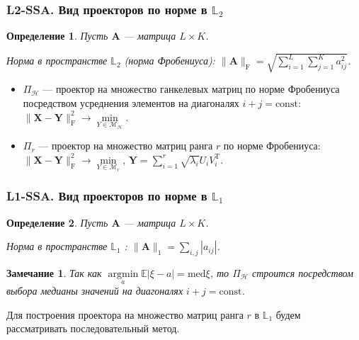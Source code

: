 \documentclass[10pt, ucs, notheorems, handout]{beamer}
\DeclareMathOperator*{\argminB}{argmin}   %
\newtheorem{def1}{Определение}
\newtheorem{notice}{Замечание}
\begin{document}
\begin{frame}
\frametitle{L2-SSA. Вид проекторов по норме в $\mathbb{L}_2$}
\begin{def1} 
Пусть $\mathbf{A}$ --- матрица $L\times K$.

Норма в пространстве $\mathbb{L}_2$ (норма Фробениуса):  $\|\mathbf{A}\|_\mathrm{F} = \sqrt{\sum\limits_{i=1}^{L} {\sum\limits_{j=1}^{K} a_{ij}^2}}$.			
\end{def1}
\begin{itemize}
\item
$\Pi_{\mathcal{H}}$ --- проектор на множество ганкелевых матриц по норме Фробениуса посредством усреднения элементов на диагоналях $i+j=\text{const}$:
$\|\mathbf{X}-\mathbf{Y}\|_\mathrm{F}^2 \longrightarrow \min\limits_{Y \in \mathcal{M}_{\mathcal{H}} } $.\\
\item
$\Pi_{r}$ --- проектор на множество матриц ранга $r$ по норме Фробениуса:  $\|\mathbf{X}-\mathbf{Y}\|_\mathrm{F}^2 \longrightarrow \min\limits_{Y \in \mathcal{M}_{r} } $, $\mathbf{Y}=\sum \limits_{i=1}^{r}{\sqrt{\lambda_i}U_iV_i^\mathrm{T}}$.
\end{itemize}
\end{frame}

\begin{frame}
\frametitle{L1-SSA. Вид проекторов по норме в $\mathbb{L}_1$}
\begin{def1} 
Пусть $\mathbf{A}$ --- матрица $L\times K$.

Норма в пространстве $\mathbb{L}_1$ :  $\|\mathbf{A}\|_1 = \sum\limits_{i,j}^{} {|a_{ij}|}$.		
\end{def1}
\begin{notice}
Так как	$\argminB\limits_a \mathbb{E} |\xi - a| = \mathrm{med} \xi $, то $\Pi_{\mathcal{H}}$ строится посредством выбора медианы значений на диагоналях $i+j=\text{const}$.
\end{notice}
Для построения проектора на множество матриц ранга $r$ в $\mathbb{L}_1$ будем рассматривать \alert{последовательный метод}.
\end{frame}
\end{document}
